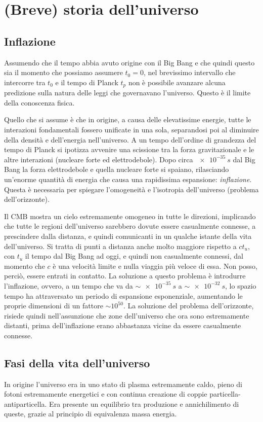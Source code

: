 \section{(Breve) storia dell'universo}\label{sec:storia-universo}
\subsection{Inflazione}\label{inflazione}
Assumendo che il tempo abbia avuto origine con il Big Bang e che quindi questo sia il momento che possiamo assumere $t_0=0$, nel brevissimo intervallo che intercorre tra $t_0$ e il tempo di Planck $t_p$ non è possibile avanzare alcuna predizione sulla natura delle leggi che governavano l'universo. Questo è il limite della conoscenza fisica.

Quello che si assume è che in origine, a causa delle elevatissime energie, tutte le interazioni fondamentali fossero unificate in una sola, separandosi poi al diminuire della densità e dell'energia nell'universo. A un tempo dell'ordine di grandezza del tempo di Planck si ipotizza avvenire una scissione tra la forza gravitazionale e le altre interazioni (nucleare forte ed elettrodebole). Dopo circa $\SI{e-35}{s}$ dal Big Bang la forza elettrodebole e quella nucleare forte si spaiano, rilasciando un'enorme quantità di energia che causa una rapidissima espansione: \emph{inflazione}. Questa è necessaria per spiegare l'omogeneità e l'isotropia dell'universo (problema dell'orizzonte).

Il CMB mostra un cielo estremamente omogeneo in tutte le direzioni, implicando che tutte le regioni dell'universo sarebbero dovute essere casualmente connesse, a prescindere dalla distanza, e quindi comunicanti in un qualche istante della vita dell'universo. Si tratta di punti a distanza anche molto maggiore rispetto a $ct_u$, con $t_u$ il tempo dal Big Bang ad oggi, e quindi non casualmente connessi, dal momento che $c$ è una velocità limite e nulla viaggia più veloce di essa. Non posso, perciò, essere entrati in contatto. La soluzione a questo problema è introdurre l'inflazione, ovvero, a un tempo che va da $\sim \SI{e-35}{s}$ a $\sim \SI{e-32}{s}$, lo spazio tempo ha attraversato un periodo di espansione esponenziale, aumentando le proprie dimensioni di un fattore $\sim 10^{50}$. La soluzione del problema dell'orizzonte, risiede quindi nell'assunzione che zone dell'universo che ora sono estremamente distanti, prima dell'inflazione erano abbastanza vicine da essere casualmente connesse.

\subsection{Fasi della vita dell'universo}\label{sec:fasi-universo}
In origine l'universo era in uno stato di plasma estremamente caldo, pieno di fotoni estremamente energetici e con continua creazione di coppie particella-antiparticella. Era presente un equilibrio tra produzione e annichilimento di queste, grazie al principio di equivalenza massa energia. 

